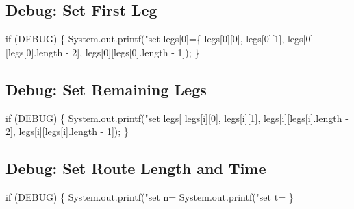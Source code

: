 \subsection{Debug: Set First Leg}

\nwenddocs{}\endmoddef\nwstartdeflinemarkup{}\nwenddeflinemarkup
if (DEBUG) \{
  System.out.printf("set legs[0]=\{ %
      legs[0][0], legs[0][1], legs[0][legs[0].length - 2], legs[0][legs[0].length - 1]);
\}
\nwendcode{}\nwdocspar

\subsection{Debug: Set Remaining Legs}

\nwenddocs{}\endmoddef\nwstartdeflinemarkup{}\nwenddeflinemarkup
if (DEBUG) \{
  System.out.printf("set legs[%
      legs[i][0], legs[i][1], legs[i][legs[i].length - 2], legs[i][legs[i].length - 1]);
\}
\nwendcode{}\nwdocspar

\subsection{Debug: Set Route Length and Time}

\nwenddocs{}\endmoddef\nwstartdeflinemarkup{}\nwenddeflinemarkup
if (DEBUG) \{
  System.out.printf("set n=%
  System.out.printf("set t=%
\}
\nwendcode{}\nwdocspar

